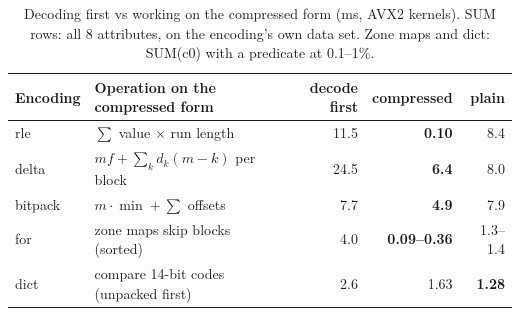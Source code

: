 \begin{table}[t]
\centering\small
\caption{Decoding first vs working on the compressed form (ms, AVX2 kernels). SUM rows: all 8
attributes, on the encoding's own data set. Zone maps and dict: SUM(c0) with a predicate at
0.1--1\%.}
\label{tab:encdecode}
\begin{tabular}{llrrr}
\toprule
Encoding & Operation on the compressed form & decode first & compressed & plain \\
\midrule
rle & $\sum$ value $\times$ run length & 11.5 & \textbf{0.10} & 8.4 \\
delta & $m f + \sum_k d_k (m-k)$ per block & 24.5 & \textbf{6.4} & 8.0 \\
bitpack & $m \cdot \min + \sum$ offsets & 7.7 & \textbf{4.9} & 7.9 \\
for & zone maps skip blocks (sorted) & 4.0 & \textbf{0.09--0.36} & 1.3--1.4 \\
dict & compare 14-bit codes (unpacked first) & 2.6 & 1.63 & \textbf{1.28} \\
\bottomrule
\end{tabular}
\end{table}

